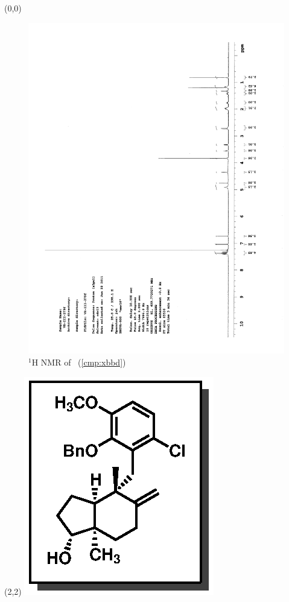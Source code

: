 \begin{textblock}{20}(0,0)
\begin{figure}[htb]
\caption{$^1$H NMR of \CMPxbbd\ (\ref{cmp:xbbd})}
\includegraphics[scale=0.75, trim = 0mm 0mm 0mm 5mm,
clip]{chp_singlecarbon/images/nmr/xbbdH}
\vspace{-100pt}
\end{figure}
\end{textblock}
\begin{textblock}{1}(2,2)
\includegraphics[scale=0.8, angle=90]{chp_singlecarbon/images/xbbd}
\end{textblock}
